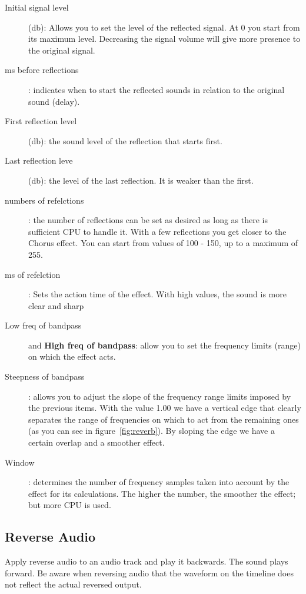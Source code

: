 \begin{description}
	\item[Initial signal level](db): Allows you to set the level of the reflected signal. At 0 you start from its maximum level. Decreasing the signal volume will give more presence to the original signal.
	\item[ms before reflections]: indicates when to start the reflected sounds in relation to the original sound  (delay).
	\item[First reflection level] (db): the sound level of the reflection that starts first.
	\item[Last reflection leve] (db): the level of the last reflection. It is weaker than the first.
	\item[numbers of refelctions]: the number of reflections can be set as desired as long as there is sufficient CPU to handle it. With a few reflections you get closer to the Chorus effect. You can start from values of 100 - 150, up to a maximum of 255.
	\item[ms of refelction]: Sets the action time of the effect. With high values, the sound is more clear and sharp
	\item[Low freq of bandpass] and \textbf{High freq of bandpass}: allow you to set the frequency limits (range) on which the effect acts.
	\item[Steepness of bandpass]: allows you to adjust the slope of the frequency range limits imposed by the previous items. With the value 1.00 we have a vertical edge that clearly separates the range of frequencies on which to act from the remaining ones (as you can see in figure~\ref{fig:reverb}). By sloping the edge we have a certain overlap and a smoother effect.
	\item[Window]: determines the number of frequency samples taken into account by the effect for its calculations. The higher the number, the smoother the effect; but more CPU is used.
\end{description}

\subsection{Reverse Audio}%
\label{sub:reverse_audio}

Apply reverse audio to an audio track and play it backwards. The sound plays forward. Be aware when reversing audio that the waveform on the timeline does not reflect the actual reversed output.

